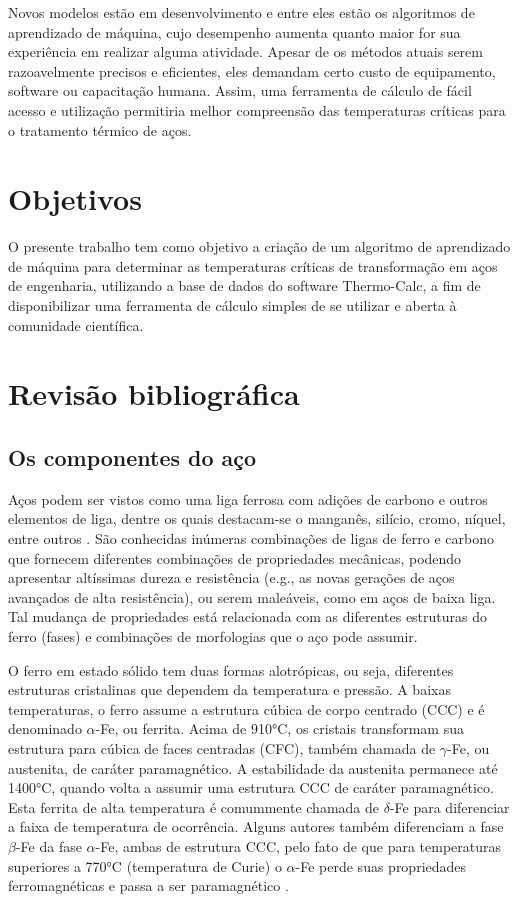 \documentclass[brazil,tese,epusp]{usp}
\begin{document}
Novos modelos estão em desenvolvimento e entre eles estão os algoritmos de aprendizado de máquina, cujo desempenho aumenta quanto maior for sua experiência em realizar alguma atividade. Apesar de os métodos atuais serem razoavelmente precisos e eficientes, eles demandam certo custo de equipamento, software ou capacitação humana. Assim, uma ferramenta de cálculo de fácil acesso e utilização permitiria melhor compreensão das temperaturas críticas para o tratamento térmico de aços.

\chapter{Objetivos}

O presente trabalho tem como objetivo a criação de um algoritmo de aprendizado de máquina para determinar as temperaturas críticas de transformação em aços de engenharia, utilizando a base de dados do software Thermo-Calc\textregistered{}, a fim de disponibilizar uma ferramenta de cálculo simples de se utilizar e aberta à comunidade científica.

\chapter{Revisão bibliográfica}

\section{Os componentes do aço}

Aços podem ser vistos como uma liga ferrosa com adições de carbono e outros elementos de liga, dentre os quais destacam-se o manganês, silício, cromo, níquel, entre outros \cite{Dossett2006}. São conhecidas inúmeras combinações de ligas de ferro e carbono que fornecem diferentes combinações de propriedades mecânicas, podendo apresentar altíssimas dureza e resistência (e.g., as novas gerações de aços avançados de alta resistência), ou serem maleáveis, como em aços de baixa liga. Tal mudança de propriedades está relacionada com as diferentes estruturas do ferro (fases) e combinações de morfologias que o aço pode assumir.

O ferro em estado sólido tem duas formas alotrópicas, ou seja, diferentes estruturas cristalinas que dependem da temperatura e pressão. A baixas temperaturas, o ferro assume a estrutura cúbica de corpo centrado (CCC) e é denominado $\alpha$-Fe, ou ferrita. Acima de 910°C, os cristais transformam sua estrutura para cúbica de faces centradas (CFC), também chamada de $\gamma$-Fe, ou austenita, de caráter paramagnético. A estabilidade da austenita permanece até 1400°C, quando volta a assumir uma estrutura CCC de caráter paramagnético. Esta ferrita de alta temperatura é comummente chamada de $\delta$-Fe para diferenciar a faixa de temperatura de ocorrência. Alguns autores também diferenciam a fase $\beta$-Fe da fase $\alpha$-Fe, ambas de estrutura CCC, pelo fato de que para temperaturas superiores a 770°C (temperatura de Curie) o $\alpha$-Fe perde suas propriedades ferromagnéticas e passa a ser paramagnético \cite{Totten2006}.
\end{document}
